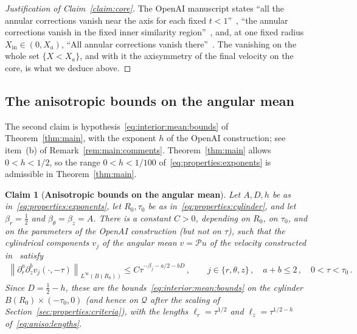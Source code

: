 \documentclass[11pt,reqno]{amsproc}
\numberwithin{equation}{section}
\newtheorem{claim}[theorem]{Claim}
\theoremstyle{remark}
\newcommand{\p}{\partial}
\newcommand{\norm}[1]{\left\|#1\right\|}
\begin{document}
\begin{proof}[Justification of Claim~\ref{claim:core}]
The OpenAI manuscript states ``all the annular corrections vanish near the axis for each fixed $t<1$''~\cite[p.~117]{OpenAIManuscript}, ``the annular corrections vanish in the fixed inner similarity region''~\cite[p.~124]{OpenAIManuscript}, and, at one fixed radius $X_{\mathrm{in}}\in(0,X_a)$, ``All annular corrections vanish there''~\cite[p.~116, Step~5]{OpenAIManuscript}. The vanishing on the whole set $\{X<X_a\}$, and with it the axisymmetry of the final velocity on the core, is what we deduce above.
\end{proof}

\subsection{The anisotropic bounds on the angular mean}
\label{sec:properties:values}

The second claim is hypothesis~\eqref{eq:interior:mean:bounds} of Theorem~\ref{thm:main}, with the exponent $h$ of the OpenAI construction; see item~(b) of Remark~\ref{rem:main:comments}. Theorem~\ref{thm:main} allows $0<h<1/2$, so the range $0<h<1/100$ of~\eqref{eq:properties:exponents} is admissible in Theorem~\ref{thm:main}.

\begin{claim}[{\bf Anisotropic bounds on the angular mean}]
\label{claim:mean}
Let $A,D,h$ be as in~\eqref{eq:properties:exponents}, let $R_0,\tau_0$ be as in~\eqref{eq:properties:cylinder}, and let $\beta_r=\frac12$ and $\beta_\theta=\beta_z=A$. There is a constant $C>0$, depending on $R_0$, on $\tau_0$, and on the parameters of the OpenAI construction (but not on $\tau$), such that the cylindrical components $v_j$ of the angular mean $v=\mathcal Pu$ of the velocity constructed in~\cite{OpenAIManuscript} satisfy
\begin{align}
\norm{\p_r^a\p_z^bv_j(\cdot,-\tau)}_{L^\infty(B(R_0))}
\le C\tau^{-\beta_j-a/2-bD}
\,,\qquad
j\in\{r,\theta,z\}
\,,\quad a+b\le2
\,,\quad 0<\tau<\tau_0
\,.
\label{eq:properties:mean:derivatives}
\end{align}
Since $D=\frac12-h$, these are the bounds~\eqref{eq:interior:mean:bounds} on the cylinder $B(R_0)\times(-\tau_0,0)$ (and hence on $\mathcal Q$ after the scaling of Section~\ref{sec:properties:criteria}), with the lengths $\ell_r=\tau^{1/2}$ and $\ell_z=\tau^{1/2-h}$ of~\eqref{eq:aniso:lengths}.
\end{claim}
\end{document}
